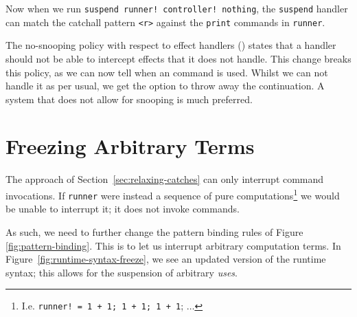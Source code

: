 \documentclass[msc,deptreport,cs]{infthesis} %
\newcommand{\code}[1]{\lstinline{#1}}
\begin{document}
\noindent Now when we run \code{suspend runner! controller! nothing}, the
\code{suspend} handler can match the catchall pattern \code{<r>} against the
\code{print} commands in \code{runner}.

The no-snooping policy with respect to effect handlers (\cite{convent2020doo})
states that a handler should not be able to intercept effects that it does not
handle. This change breaks this policy, as we can now tell when an command is
used. Whilst we can not handle it as per usual, we get the option to throw away
the continuation. A system that does not allow for snooping is much preferred.

\section{Freezing Arbitrary Terms}
\label{sec:freezing-terms}

The approach of Section~\ref{sec:relaxing-catches} can only interrupt command
invocations. If \code{runner} were instead a sequence of pure
computations\footnote{I.e. \code{runner! = 1 + 1; 1 + 1; 1 + 1}; $\ldots$} we would
be unable to interrupt it; it does not invoke commands.

As such, we need to further change the pattern binding rules of Figure
\ref{fig:pattern-binding}. This is to let us interrupt arbitrary computation
terms. In Figure~\ref{fig:runtime-syntax-freeze}, we see an updated version of
the runtime syntax; this allows for the suspension of arbitrary \emph{uses}.
\end{document}
